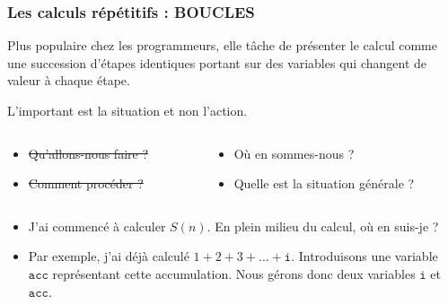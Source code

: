 \documentclass[10pt]{beamer}
\begin{document}
\begin{frame}
  \frametitle{ Les calculs répétitifs : BOUCLES}
  Plus populaire chez les programmeurs, elle tâche de présenter le calcul comme une succession d'étapes identiques portant sur des variables qui changent de valeur à chaque étape.

  \begin{alertblock}{L'important est la situation et non l'action.}

\begin{columns}[t]
\begin{column}{0.43\textwidth}
  \begin{itemize}
  \item \sout{Qu'allons-nous faire ?}
  \item \sout{Comment procéder ?}
  \end{itemize}
\end{column}
\begin{column}{0.57\textwidth}
  \begin{itemize}
  \item Où en sommes-nous ?
  \item Quelle est la situation générale ?
  \end{itemize}
\end{column}
\end{columns}

  \end{alertblock}

  \begin{itemize}
\item J'ai commencé à calculer $S(n)$. En plein milieu du calcul, où en suis-je ?
\item Par exemple, j'ai déjà calculé $1 + 2 + 3 + \ldots + \mathtt{i}$.
Introduisons une variable $\mathtt{acc}$ représentant cette accumulation.
Nous gérons donc deux variables $\mathtt{i}$ et $\mathtt{acc}$.
\end{itemize}

\end{frame}
\end{document}
